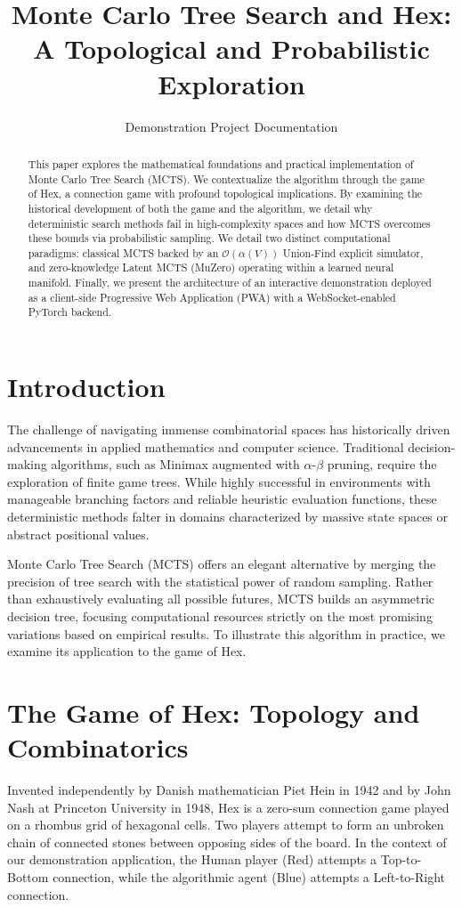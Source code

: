 \documentclass[12pt,a4paper]{article}
\title{\textbf{Monte Carlo Tree Search and Hex:\\ A Topological and Probabilistic Exploration}}
\author{Demonstration Project Documentation}
\date{}
\begin{document}
\maketitle

\begin{abstract}
This paper explores the mathematical foundations and practical implementation of Monte Carlo Tree Search (MCTS). We contextualize the algorithm through the game of Hex, a connection game with profound topological implications. By examining the historical development of both the game and the algorithm, we detail why deterministic search methods fail in high-complexity spaces and how MCTS overcomes these bounds via probabilistic sampling. We detail two distinct computational paradigms: classical MCTS backed by an $\mathcal{O}(\alpha(V))$ Union-Find explicit simulator, and zero-knowledge Latent MCTS (MuZero) operating within a learned neural manifold. Finally, we present the architecture of an interactive demonstration deployed as a client-side Progressive Web Application (PWA) with a WebSocket-enabled PyTorch backend.
\end{abstract}

\section{Introduction}
The challenge of navigating immense combinatorial spaces has historically driven advancements in applied mathematics and computer science. Traditional decision-making algorithms, such as Minimax augmented with $\alpha$-$\beta$ pruning, require the exploration of finite game trees. While highly successful in environments with manageable branching factors and reliable heuristic evaluation functions, these deterministic methods falter in domains characterized by massive state spaces or abstract positional values. 

Monte Carlo Tree Search (MCTS) offers an elegant alternative by merging the precision of tree search with the statistical power of random sampling. Rather than exhaustively evaluating all possible futures, MCTS builds an asymmetric decision tree, focusing computational resources strictly on the most promising variations based on empirical results. To illustrate this algorithm in practice, we examine its application to the game of Hex.

\section{The Game of Hex: Topology and Combinatorics}
Invented independently by Danish mathematician Piet Hein in 1942 and by John Nash at Princeton University in 1948, Hex is a zero-sum connection game played on a rhombus grid of hexagonal cells. Two players attempt to form an unbroken chain of connected stones between opposing sides of the board. In the context of our demonstration application, the Human player (Red) attempts a Top-to-Bottom connection, while the algorithmic agent (Blue) attempts a Left-to-Right connection.
\end{document}
